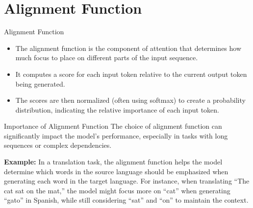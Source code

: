 \section{Alignment Function}
\begin{frame}{Alignment Function}
  \begin{itemize}
    \item The alignment function is the component of attention that determines how much focus to place on different parts of the input sequence.
    \item It computes a score for each input token relative to the current output token being generated.
    \item The scores are then normalized (often using softmax) to create a probability distribution, indicating the relative importance of each input token.
  \end{itemize}
\end{frame}

\begin{frame}{Importance of Alignment Function}
  \justifying
  The choice of alignment function can significantly impact the model’s performance, especially in tasks with long sequences or complex dependencies.

  \vspace{1em}
  \small
  \textbf{Example:} In a translation task, the alignment function helps the model determine which words in the source language should be emphasized when generating each word in the target language. For instance, when translating “The cat sat on the mat,” the model might focus more on “cat” when generating “gato” in Spanish, while still considering “sat” and “on” to maintain the context.
\end{frame}

